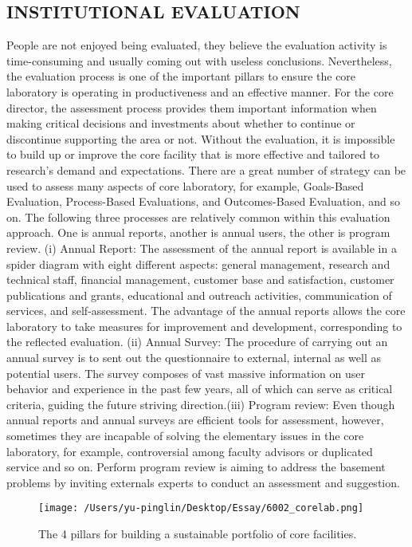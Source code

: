\documentclass[12pt]{article}
\begin{document}
\subsection{INSTITUTIONAL EVALUATION}
People are not enjoyed being evaluated, they believe the evaluation activity is time-consuming and usually coming out with useless conclusions. Nevertheless, the evaluation process is one of the important pillars to ensure the core laboratory is operating in productiveness and an effective manner. For the core director, the assessment process provides them important information when making critical decisions and investments about whether to continue or discontinue supporting the area or not. Without the evaluation, it is impossible to build up or improve the core facility that is more effective and tailored to research's demand and expectations. There are a great number of strategy can be used to assess many aspects of core laboratory, for example, Goals-Based Evaluation, Process-Based Evaluations, and Outcomes-Based Evaluation, and so on. The following three processes are relatively common within this evaluation approach. One is annual reports, another is annual users, the other is program review. (i) Annual Report:
The assessment of the annual report is available in a spider diagram with eight different aspects: general management, research and technical staff, financial management, customer base and satisfaction, customer publications and grants, educational and outreach activities, communication of services, and self-assessment. The advantage of the annual reports allows the core laboratory to take measures for improvement and development, corresponding to the reflected evaluation. (ii) Annual Survey: The procedure of carrying out an annual survey is to sent out the questionnaire to external, internal as well as potential users. The survey composes of vast massive information on user behavior and experience in the past few years, all of which can serve as critical criteria, guiding the future striving direction.(iii) Program review: Even though annual reports and annual surveys are efficient tools for assessment, however, sometimes they are incapable of solving the elementary issues in the core laboratory, for example, controversial among faculty advisors or duplicated service and so on. Perform program review is aiming to address the basement problems by inviting externals experts to conduct an assessment and suggestion.


\begin{figure}[H]
    \texttt{[image: /Users/yu-pinglin/Desktop/Essay/6002\_corelab.png]}
    \centering
    \caption{The 4 pillars for building a sustainable portfolio of
    core facilities.}
\end{figure}
\end{document}
